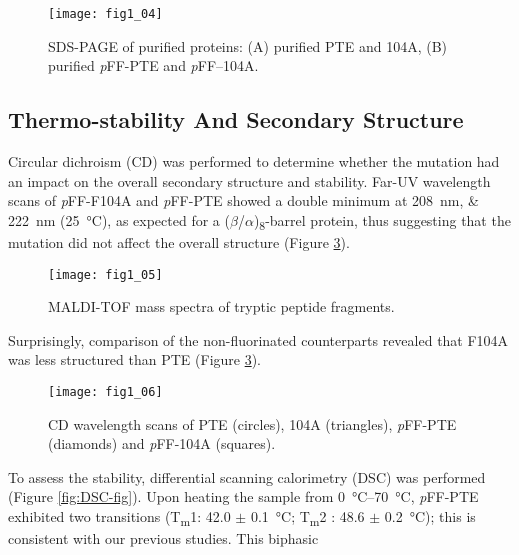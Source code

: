 \begin{refsection}
\begin{figure}[h!] \centering \texttt{[image: fig1\_04]}
    \caption[SDS-PAGE of purified proteins: (A) purified PTE and 104A, (B)
    purified \emph{p}FF-PTE and \emph{p}FF--104A.]{SDS-PAGE of purified
        proteins: (A) purified PTE and 104A, (B) purified \emph{p}FF-PTE and
        \emph{p}FF--104A.} \label{fig:sds-gel} 
\end{figure}

\subsection{Thermo-stability And Secondary Structure}

Circular dichroism (CD) was performed to determine whether the mutation had an
impact on the overall secondary structure and stability. Far-UV wavelength
scans of \emph{p}FF-F104A and \emph{p}FF-PTE showed a double minimum at
\SIlist{208;222}{\nm} (\SI{25}{\celsius}), as expected for a
($\beta$/$\alpha$)\textsubscript{8}-barrel protein, thus suggesting that the
mutation did not affect the overall structure (Figure \ref{fig:CD-fig}).  
\begin{figure}[h!] \centering \texttt{[image: fig1\_05]}
    \caption[MALDI-TOF mass spectra of tryptic peptide fragments.]{MALDI-TOF
    mass spectra of tryptic peptide fragments.} \label{fig:MALDI-fig} 
\end{figure}
Surprisingly, comparison of the non-fluorinated counterparts revealed that
F104A was less structured than PTE (Figure \ref{fig:CD-fig}). 
\begin{figure}[h!] \centering \texttt{[image: fig1\_06]}
    \caption[CD wavelength scans of PTE (circles), 104A (triangles),
    \emph{p}FF-PTE (diamonds) and \emph{p}FF-104A (squares).]{CD wavelength
        scans of PTE (circles), 104A (triangles), \emph{p}FF-PTE (diamonds) and
        \emph{p}FF-104A (squares).} \label{fig:CD-fig} 
\end{figure}
To assess the stability, differential scanning calorimetry (DSC) was performed
(Figure \ref{fig:DSC-fig}). Upon heating the sample from \SIrange{0}{70}{\celsius},
\emph{p}FF-PTE exhibited two transitions (T\textsubscript{m}1: 42.0 $\pm$
\SI{0.1}{\celsius}; T\textsubscript{m}2 : 48.6 $\pm$ \SI{0.2}{\celsius}); this
is consistent with our previous studies.\cite{Baker2011b} This biphasic

\end{refsection}
